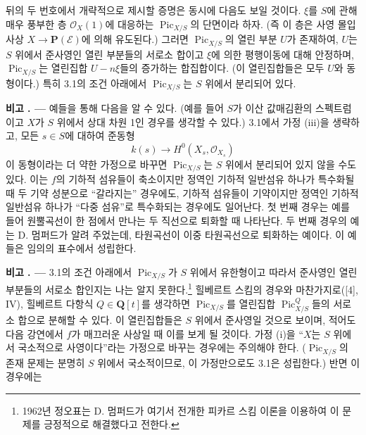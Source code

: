 \documentclass[11pt,twoside,openany]{book}
\numberwithin{equation}{section}
\theoremstyle{plain}
\theoremstyle{definition}
\theoremstyle{remark}
\newcommand{\result}[2]{%
  \par\medskip\noindent\textbf{#1%
  \if\relax\detokenize{#2}\relax\else\space#2\fi. ---}\enspace
}
\begin{document}
뒤의 두 번호에서 개략적으로 제시할 증명은 동시에 다음도 보일 것이다.
$\xi$를 $S$에 관해 매우 풍부한 층 $\mathcal O_X(1)$에 대응하는
$\operatorname{Pic}_{X/S}$의 단면이라 하자. (즉 이 층은 사영 몰입 사상
$X\longrightarrow\mathbf P(\mathcal E)$에 의해 유도된다.) 그러면
$\operatorname{Pic}_{X/S}$의 열린 부분 $U$가 존재하여, $U$는 $S$ 위에서
준사영인 열린 부분들의 서로소 합이고 $\xi$에 의한 평행이동에 대해
안정하며, $\operatorname{Pic}_{X/S}$는 열린집합 $U-n\xi$들의 증가하는
합집합이다. (이 열린집합들은 모두 $U$와 동형이다.) 특히 3.1의 조건
아래에서 $\operatorname{Pic}_{X/S}$는 $S$ 위에서 분리되어 있다.

\result{비고}{3.2} 예들을 통해 다음을 알 수 있다. (예를 들어 $S$가 이산
값매김환의 스펙트럼이고 $X$가 $S$ 위에서 상대 차원 1인 경우를 생각할 수
있다.) 3.1에서 가정 (iii)을 생략하고, 모든 $s\in S$에 대하여 준동형
\[
k(s)\longrightarrow H^0(X_s,\mathcal O_{X_s})
\]
이 동형이라는 더 약한 가정으로 바꾸면 $\operatorname{Pic}_{X/S}$는
$S$ 위에서 분리되어 있지 않을 수도 있다. 이는 $f$의 기하적 섬유들이
축소이지만 정역인 기하적 일반섬유 하나가 특수화될 때 두 기약 성분으로
``갈라지는'' 경우에도, 기하적 섬유들이 기약이지만 정역인 기하적
일반섬유 하나가 ``다중 섬유''로 특수화되는 경우에도 일어난다. 첫 번째
경우는 예를 들어 원뿔곡선이 한 점에서 만나는 두 직선으로 퇴화할 때
나타난다. 두 번째 경우의 예는 D. 멈퍼드가 알려 주었는데, 타원곡선이
이중 타원곡선으로 퇴화하는 예이다. 이 예들은 임의의 표수에서 성립한다.

\result{비고}{3.3} 3.1의 조건 아래에서 $\operatorname{Pic}_{X/S}$가
$S$ 위에서 유한형이고 따라서 준사영인 열린 부분들의 서로소 합인지는
나는 알지 못한다.\footnote{1962년 정오표는 D. 멈퍼드가 여기서 전개한
피카르 스킴 이론을 이용하여 이 문제를 긍정적으로 해결했다고 전한다.}
힐베르트 스킴의 경우와 마찬가지로([4], IV), 힐베르트 다항식
$Q\in\mathbf Q[t]$를 생각하면 $\operatorname{Pic}_{X/S}$를 열린집합
$\operatorname{Pic}^{Q}_{X/S}$들의 서로소 합으로 분해할 수 있다. 이
열린집합들은 $S$ 위에서 준사영일 것으로 보이며, 적어도 다음 강연에서
$f$가 매끄러운 사상일 때 이를 보게 될 것이다. 가정 (i)을 ``$X$는
$S$ 위에서 국소적으로 사영이다''라는 가정으로 바꾸는 경우에는 주의해야
한다. ($\operatorname{Pic}_{X/S}$의 존재 문제는 분명히 $S$ 위에서
국소적이므로, 이 가정만으로도 3.1은 성립한다.) 반면 이 경우에는
\end{document}
